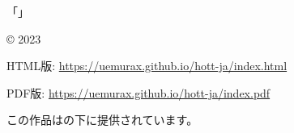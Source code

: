 \documentclass[b5paper]{ltjsbook}
\title{\myTitle}
\author{\myAuthor}
\begin{document}
\frontmatter

\maketitle                      %

\pagebreak
\hspace{0pt}
\vfill
\noindent 「\myTitle」
\par\noindent \copyright{} 2023 \myAuthor
\par\vspace{1em}
\noindent HTML版: \url{https://uemurax.github.io/hott-ja/index.html}
\par\noindent PDF版: \url{https://uemurax.github.io/hott-ja/index.pdf}
\par\vspace{1em}
\noindent この作品はの下に提供されています。
\vfill
\hspace{0pt}
\thispagestyle{empty}
\pagebreak


\tableofcontents                %
\listoffigures

\mainmatter



\backmatter

\myPrintBibliography

\myPrintIndex

\myPrintNodeIndex
\end{document}
